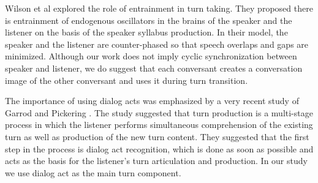 Wilson et al \cite{wilson2005oscillator} explored the role of entrainment in turn taking. They proposed there is entrainment of endogenous oscillators in the brains of the speaker and the listener on the basis of the speaker syllabus production. In their model, the speaker and the listener are counter-phased so that speech overlaps and gaps are minimized. Although our work does not imply cyclic synchronization between speaker and listener, we do suggest that each conversant creates a conversation image of the other conversant and uses it during turn transition.

The importance of using dialog acts was emphasized by a very recent study of Garrod and Pickering \cite{garrod2015use}. The study suggested that turn production is a multi-stage process in which the listener performs simultaneous comprehension of the existing turn as well as production of the new turn content. They suggested that the first step in the process is dialog act recognition, which is done as soon as possible and acts as the basis for the listener's turn articulation and production. In our study we use dialog act as the main turn component.
